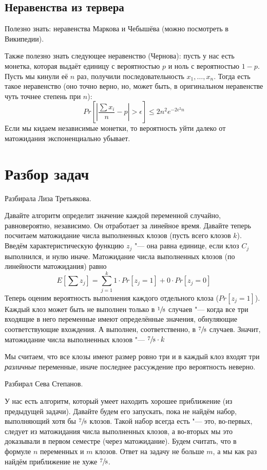 \subsection{Неравенства из тервера}
	Полезно знать: неравенства Маркова и Чебышёва (можно посмотреть в Википедии).

	Также полезно знать следующее неравенство (Чернова):
	пусть у нас есть монетка, которая выдаёт единицу с вероятностью $p$
	и ноль с вероятностью $1-p$.
	Пусть мы кинули её $n$ раз, получили последовательность $x_1, \dots, x_n$.
	Тогда есть такое неравенство (оно точно верно, но, может быть, в оригинальном неравенстве чуть
	точнее степень при $n$):
	\[
		Pr\left[\left|\frac{\sum x_i}{n} - p\right| > \epsilon\right] \le 2n^2e^{-2\epsilon^2n}
	\]
	Если мы кидаем независимые монетки, то вероятность уйти далеко от матожидания экспоненциально убывает.

\section{Разбор задач}
	Разбирала Лиза Третьякова.

	Давайте алгоритм определит значение каждой переменной случайно, равновероятно, независимо.
	Он отработает за линейное время.
	Давайте теперь посчитаем матожидание числа выполненных клозов (пусть всего клозов $k$).
	Введём характеристическую функцию $z_j$ "--- она равна единице,
	если клоз $C_j$ выполнился, и нулю иначе.
	Матожидание числа выполненных клозов (по линейности матожидания) равно
	\[ E\left[\sum z_j\right] = \sum_{j=1}^k 1 \cdot Pr[z_j = 1] + 0 \cdot Pr[z_j = 0]\]
	Теперь оценим вероятность выполнения каждого отдельного клоза ($Pr[z_j=1]$).
	Каждый клоз может быть не выполнен только в $\sfrac 18$ случаев "--- когда все три входящие
	в него переменные имеют определённые значения, обнуляющие соответствующие вхождения.
	А выполнен, соответственно, в $\sfrac 78$ случаев.
	Значит, матожидание числа выполненных клозов "--- $\sfrac 78 \cdot k$

	\begin{Rem}
		Мы считаем, что все клозы имеют размер ровно три и в каждый клоз входят
		три \textit{различные} переменные, иначе последнее рассуждение про вероятность неверно.
	\end{Rem}

	Разбирал Сева Степанов.

	У нас есть алгоритм, который умеет находить хорошее приближение (из предыдущей задачи).
	Давайте будем его запускать, пока не найдём набор, выполняющий хотя бы $\sfrac 78$ клозов.
	Такой набор всегда есть "--- это, во-первых, следует из матожидания числа выполненных клозов,
	а во-вторых мы это доказывали в первом семестре (через матожидание).
	Будем считать, что в формуле $n$ переменных и $m$ клозов.
	Ответ на задачу не больше $m$, а мы как раз найдём приближение не хуже $\sfrac 78$.


